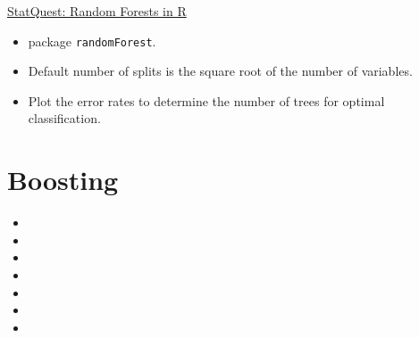 \documentclass[12pt, titlepage, french]{report}
\begin{document}
\begin{YTB_SUMM_AUTO_NUMB}[label = {SQ-RF-R}]{\href{https://www.youtube.com/watch?v=6EXPYzbfLCE&feature=youtu.be}{StatQuest: Random Forests in R}}
\begin{itemize}[leftmargin = *]
	\item	package \texttt{randomForest}.
	\item	Default number of splits is the square root of the number of variables.
	\item	Plot the error rates to determine the number of trees for optimal classification.
\end{itemize}
\end{YTB_SUMM_AUTO_NUMB}

\pagebreak
\section{Boosting}

\begin{YTB_vids}
\begin{itemize}
	\item	{}
	\item	{}
	\item	{}
	\item	{}
	\item	{}
	\item	{}
	\item	{}
\end{itemize}
\end{YTB_vids}
\end{document}
